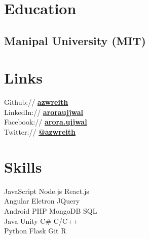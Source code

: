 \documentclass[a4paper]{resume}
\begin{document}
\begin{minipage}[t]{0.33\textwidth} %


\section{Education}

\subsection{Manipal University (MIT)}


\sectionspace %



\section{Links}

Github:// \href{https://github.com/azwreith}{\bf azwreith} \\
LinkedIn:// \href{https://in.linkedin.com/in/aroraujjwal}{\bf aroraujjwal} \\
Facebook:// \href{https://www.facebook.com/arora.ujjwal}{\bf arora.ujjwal} \\
Twitter:// \href{https://twitter.com/DarthUjj}{\bf @azwreith} \\

\sectionspace %



\section{Skills}

JavaScript \textbullet{} Node.js \textbullet{}  React.js \\
Angular \textbullet{} Eletron \textbullet{} JQuery \\
Android \textbullet{} PHP \textbullet{} MongoDB \textbullet{} SQL \\
Java \textbullet{} Unity \textbullet{} C\# \textbullet{} C/C++ \\
Python \textbullet{} Flask \textbullet{} Git \textbullet{} R \\


\end{minipage}
\end{document}
